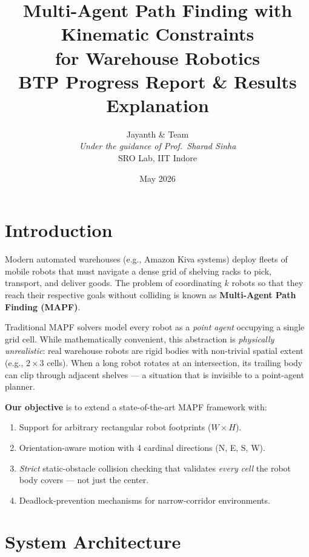 \documentclass[12pt, a4paper]{article}
\title{
    \textbf{Multi-Agent Path Finding with Kinematic Constraints\\for Warehouse Robotics}\\[0.5em]
    \large BTP Progress Report \& Results Explanation
}
\author{
    Jayanth \& Team\\
    \textit{Under the guidance of Prof.\ Sharad Sinha}\\
    SRO Lab, IIT Indore
}
\date{May 2026}
\begin{document}
\maketitle

\tableofcontents
\newpage

\section{Introduction}

Modern automated warehouses (e.g., Amazon Kiva systems) deploy fleets of mobile robots that must navigate a dense grid of shelving racks to pick, transport, and deliver goods. The problem of coordinating $k$ robots so that they reach their respective goals without colliding is known as \textbf{Multi-Agent Path Finding (MAPF)}.

Traditional MAPF solvers model every robot as a \emph{point agent} occupying a single grid cell. While mathematically convenient, this abstraction is \emph{physically unrealistic}: real warehouse robots are rigid bodies with non-trivial spatial extent (e.g., $2\times3$ cells). When a long robot rotates at an intersection, its trailing body can clip through adjacent shelves --- a situation that is invisible to a point-agent planner.

\textbf{Our objective} is to extend a state-of-the-art MAPF framework with:
\begin{enumerate}[label=(\alph*)]
    \item Support for arbitrary rectangular robot footprints ($W \times H$).
    \item Orientation-aware motion with 4 cardinal directions (N, E, S, W).
    \item \emph{Strict} static-obstacle collision checking that validates \emph{every cell} the robot body covers --- not just the center.
    \item Deadlock-prevention mechanisms for narrow-corridor environments.
\end{enumerate}

\section{System Architecture}
\end{document}
